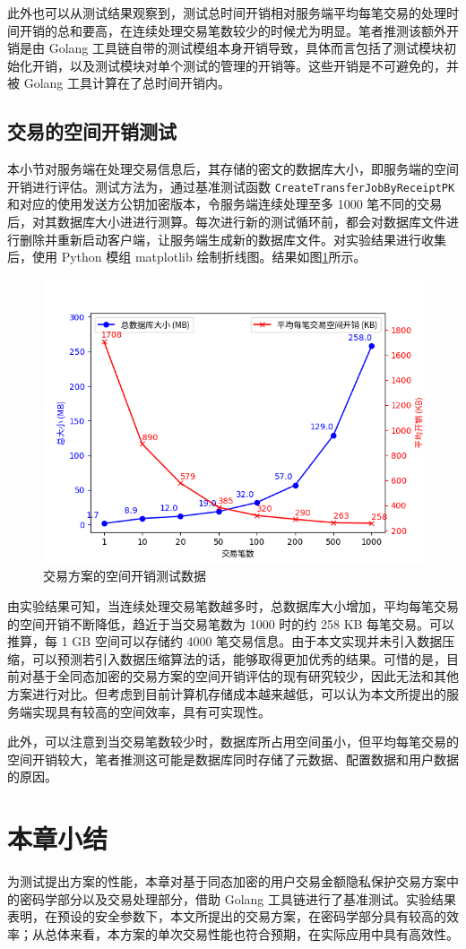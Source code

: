 此外也可以从测试结果观察到，测试总时间开销相对服务端平均每笔交易的处理时间开销的总和要高，在连续处理交易笔数较少的时候尤为明显。笔者推测该额外开销是由 Golang 工具链自带的测试模组本身开销导致，具体而言包括了测试模块初始化开销，以及测试模块对单个测试的管理的开销等。这些开销是不可避免的，并被 Golang 工具计算在了总时间开销内。

\subsection{交易的空间开销测试}

本小节对服务端在处理交易信息后，其存储的密文的数据库大小，即服务端的空间开销进行评估。测试方法为，通过基准测试函数 \verb|CreateTransferJobByReceiptPK| 和对应的使用发送方公钥加密版本，令服务端连续处理至多 1000 笔不同的交易后，对其数据库大小进进行测算。每次进行新的测试循环前，都会对数据库文件进行删除并重新启动客户端，让服务端生成新的数据库文件。对实验结果进行收集后，使用 Python 模组 matplotlib 绘制折线图。结果如图\ref{Fig:graph_database_size}所示。

\begin{figure}[h]
    \centering
    \includegraphics[width=0.8\linewidth]{./Figures/matplots/Bench_DatabaseSize.png}
    \caption{交易方案的空间开销测试数据} \label{Fig:graph_database_size}
\end{figure}

由实验结果可知，当连续处理交易笔数越多时，总数据库大小增加，平均每笔交易的空间开销不断降低，趋近于当交易笔数为 1000 时的约 258 KB 每笔交易。可以推算，每 1 GB 空间可以存储约 4000 笔交易信息。由于本文实现并未引入数据压缩，可以预测若引入数据压缩算法的话，能够取得更加优秀的结果。可惜的是，目前对基于全同态加密的交易方案的空间开销评估的现有研究较少，因此无法和其他方案进行对比。但考虑到目前计算机存储成本越来越低，可以认为本文所提出的服务端实现具有较高的空间效率，具有可实现性。

此外，可以注意到当交易笔数较少时，数据库所占用空间虽小，但平均每笔交易的空间开销较大，笔者推测这可能是数据库同时存储了元数据、配置数据和用户数据的原因。

\section{本章小结}

为测试提出方案的性能，本章对基于同态加密的用户交易金额隐私保护交易方案中的密码学部分以及交易处理部分，借助 Golang 工具链进行了基准测试。实验结果表明，在预设的安全参数下，本文所提出的交易方案，在密码学部分具有较高的效率；从总体来看，本方案的单次交易性能也符合预期，在实际应用中具有高效性。
